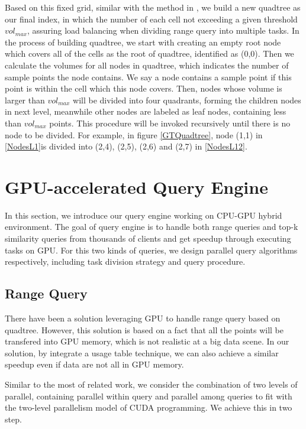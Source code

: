 \documentclass[conference]{IEEEtran}
\begin{document}
Based on this fixed grid, similar with the method in \cite{DBLP:conf/gis/LettichOS15}, we build a new quadtree as our final index, in which the number of each cell not exceeding a given threshold $vol_{max}$, assuring load balancing when dividing range query into multiple tasks. In the process of building quadtree, we start with creating an empty root node which covers all of the cells as the root of quadtree, identified as (0,0). Then we calculate the volumes for all nodes in quadtree, which indicates the number of sample points the node contains. We say a node contains a sample point if this point is within the cell which this node covers. Then, nodes whose volume is larger than $vol_{max}$ will be divided into four quadrants, forming the children nodes in next level, meanwhile other nodes are labeled as leaf nodes, containing less than $vol_{max}$ points. This procedure will be invoked recursively until there is no node to be divided. For example, in figure \ref{GTQuadtree}, node (1,1) in \ref{NodesL1}is divided into (2,4), (2,5), (2,6) and (2,7) in \ref{NodesL12}.





\section{GPU-accelerated Query Engine}
In this section, we introduce our query engine working on CPU-GPU hybrid environment. The goal of query engine is to handle both range queries and top-k similarity queries from thousands of clients and get speedup through executing tasks on GPU. For this two kinds of queries, we design parallel query algorithms respectively, including task division strategy and query procedure.

\subsection{Range Query}

There have been a solution\cite{GPUTaxi} leveraging GPU to handle range query based on quadtree. However, this solution is based on a fact that all the points will be transfered into GPU memory, which is not realistic at a big data scene. In our solution, by integrate a usage table technique, we can also achieve a similar speedup even if data are not all in GPU memory. 

Similar to the most of related work, we consider the combination of two levels of parallel, containing parallel within query and parallel among queries to fit with the two-level parallelism model of CUDA programming. We achieve this in two step. 
\end{document}
